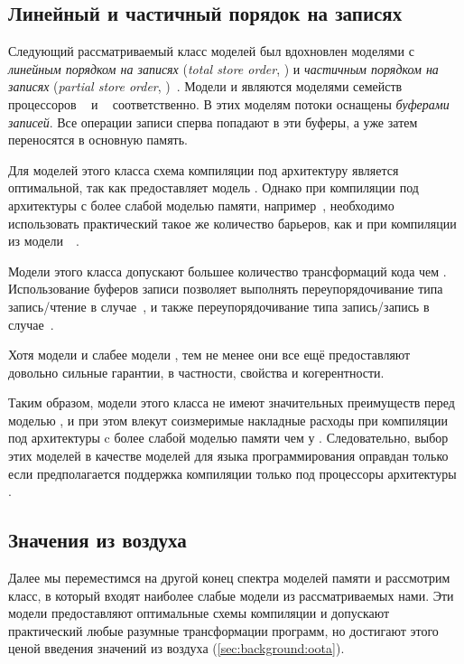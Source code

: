\subsection{Линейный и частичный порядок на записях}
\label{sec:analysis:tso}

Следующий рассматриваемый класс моделей был вдохновлен моделями с 
\emph{линейным порядком на записях} (\emph{total store order}, \TSO)
и \emph{частичным порядком на записях} (\emph{partial store order}, \PSO)~\cite{Sparc:94}.
Модели \TSO и \PSO являются моделями семейств процессоров \Intel~\cite{Sewell-al:CACM10} 
и \SPARC~\cite{Sparc:94} соответственно. 
В этих моделям потоки оснащены \emph{буферами записей}.
Все операции записи сперва попадают в эти буферы, а уже 
затем переносятся в основную память. 

Для моделей этого класса схема компиляции под архитектуру \Intel 
является оптимальной, так как \Intel предоставляет модель \TSO.  
Однако при компиляции под архитектуры с более слабой моделью памяти, 
например~\POWER, необходимо использовать практический такое же 
количество барьеров, как и при компиляции из модели~\SC~\cite{Lustig-al:AISCA15}.

Модели этого класса допускают большее количество трансформаций кода чем \SC.
Использование буферов записи позволяет выполнять переупорядочивание 
типа запись/чтение в случае~\TSO, и также 
переупорядочивание типа запись/запись в случае~\PSO.

Хотя модели \TSO и \PSO слабее модели \SC, 
тем не менее они все ещё предоставляют довольно сильные гарантии, 
в частности, свойства \DRF и когерентности.    

Таким образом, модели этого класса не имеют 
значительных преимуществ перед моделью \SC, 
и при этом влекут соизмеримые накладные расходы 
при компиляции под архитектуры c более слабой моделью памяти чем у \Intel. 
Следовательно, выбор этих моделей в качестве моделей для 
языка программирования оправдан только если предполагается 
поддержка компиляции только под процессоры архитектуры \Intel. 

\subsection{Значения из воздуха}
\label{sec:analysis:oota}

Далее мы переместимся на другой конец спектра моделей памяти
и рассмотрим класс, в который входят наиболее слабые модели
из рассматриваемых нами. 
Эти модели предоставляют оптимальные схемы компиляции и 
допускают практический любые разумные трансформации программ, 
но достигают этого ценой введения значений из воздуха 
(\cref{sec:background:oota}).

